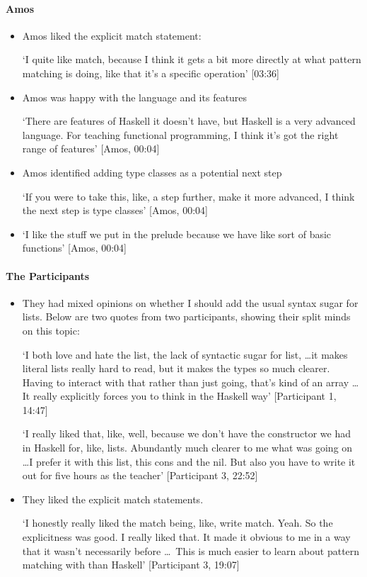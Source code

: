 \paragraph{Amos}
\begin{itemize}

    \item Amos liked the explicit match statement:
    
    `I quite like match, because I think it gets a bit more directly at what pattern matching is doing, like that it's a specific operation' [03:36]

    \item Amos was happy with the language and its features
    
    `There are features of Haskell it doesn't have, but Haskell is a very advanced language. For teaching functional programming, I think it's got the right range of features' [Amos, 00:04]

    \item Amos identified adding type classes as a potential next step 
    
    `If you were to take this, like, a step further, make it more advanced, I think the next step is type
    classes' [Amos, 00:04]
    
    \item `I like the stuff we put in the prelude because we have like sort of basic functions' [Amos, 00:04]
    
    
\end{itemize}

\paragraph{The Participants}\begin{itemize}
    \item They had mixed opinions on whether I should add the usual syntax sugar for lists. Below are two quotes from two participants, showing their split minds on this topic:
    
    `I both love and hate the list, the lack of syntactic sugar for list, \ldots it makes literal lists really hard to read, but it makes the types so much clearer. Having to interact with that rather than just going, that's kind of an array \ldots It really explicitly forces you to think in the Haskell
    way' [Participant 1, 14:47]
    
    `I really liked that, like, well, because we don't have the constructor we had in Haskell
    for, like, lists. Abundantly much clearer to me what was going on \ldots I prefer it with this list, this cons and the nil. But also you have to write it out for five hours as the teacher' [Participant 3, 22:52]

    \item They liked the explicit match statements. 
    
    `I honestly really liked the match being, like, write match. Yeah. So the
    explicitness was good. I really liked that. It made it obvious to me in a way that it wasn't necessarily before \ldots\ This is much easier to learn about pattern matching with than Haskell' [Participant 3, 19:07]
\end{itemize}

